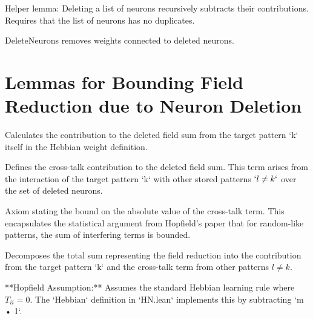 \begin{definition}\label{delete_neurons_recursive}
\leanok
Helper lemma: Deleting a list of neurons recursively subtracts their contributions.
    Requires that the list of neurons has no duplicates.
\end{definition}

\begin{definition}\label{deleted_neurons_field_effect}
\leanok
DeleteNeurons removes weights connected to deleted neurons.
\end{definition}

\section{Lemmas for Bounding Field Reduction due to Neuron Deletion}

\begin{definition}\label{hebbian_weight_deleted_neurons_l_eq_k_term}
\leanok
Calculates the contribution to the deleted field sum from the target pattern `k` itself
in the Hebbian weight definition.
\end{definition}

\begin{definition}\label{hebbian_weight_deleted_neurons_cross_talk_term}
\leanok
Defines the cross-talk contribution to the deleted field sum.
This term arises from the interaction of the target pattern `k` with other stored patterns $`l \neq k`$
over the set of deleted neurons.
\end{definition}

\begin{lemma}\label{cross_talk_term_abs_bound_assumption}
Axiom stating the bound on the absolute value of the cross-talk term.
This encapsulates the statistical argument from Hopfield's paper that for
random-like patterns, the sum of interfering terms is bounded.
\end{lemma}

\begin{lemma}\label{Hebbian_stable}
\leanok
Decomposes the total sum representing the field reduction into the contribution
from the target pattern `k` and the cross-talk term from other patterns $l \neq k.$

**Hopfield Assumption:** Assumes the standard Hebbian learning rule where $T_{ii} = 0$.
The `Hebbian` definition in `HN.lean` implements this by subtracting `m • 1`.
\end{lemma}

